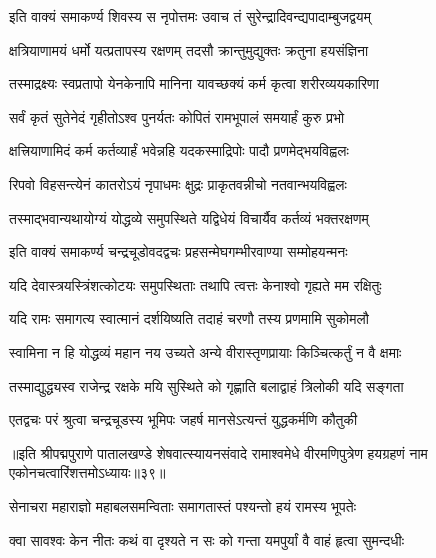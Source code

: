 \twolineshloka
{इति वाक्यं समाकर्ण्य शिवस्य स नृपोत्तमः}
{उवाच तं सुरेन्द्रादिवन्द्यपादाम्बुजद्वयम्}%


\twolineshloka
{क्षत्रियाणामयं धर्मो यत्प्रतापस्य रक्षणम्}
{तदसौ क्रान्तुमुद्युक्तः क्रतुना हयसंज्ञिना}%

\twolineshloka
{तस्माद्रक्ष्यः स्वप्रतापो येनकेनापि मानिना}
{यावच्छक्यं कर्म कृत्वा शरीरव्ययकारिणा}%

\twolineshloka
{सर्वं कृतं सुतेनेदं गृहीतोऽश्व पुनर्यतः}
{कोपितं रामभूपालं समयार्हं कुरु प्रभो}%

\twolineshloka
{क्षत्त्रियाणामिदं कर्म कर्तव्यार्हं भवेन्नहि}
{यदकस्माद्रिपोः पादौ प्रणमेद्भयविह्वलः}%

\twolineshloka
{रिपवो विहसन्त्येनं कातरोऽयं नृपाधमः}
{क्षुद्रः प्राकृतवन्नीचो नतवान्भयविह्वलः}%

\twolineshloka
{तस्माद्भवान्यथायोग्यं योद्धव्ये समुपस्थिते}
{यद्विधेयं विचार्यैव कर्तव्यं भक्तरक्षणम्}%


\twolineshloka
{इति वाक्यं समाकर्ण्य चन्द्रचूडोवदद्वचः}
{प्रहसन्मेघगम्भीरवाण्या सम्मोहयन्मनः}%

\twolineshloka
{यदि देवास्त्रयस्त्रिंशत्कोटयः समुपस्थिताः}
{तथापि त्वत्तः केनाश्वो गृह्यते मम रक्षितुः}%

\twolineshloka
{यदि रामः समागत्य स्वात्मानं दर्शयिष्यति}
{तदाहं चरणौ तस्य प्रणमामि सुकोमलौ}%

\twolineshloka
{स्वामिना न हि योद्धव्यं महान नय उच्यते}
{अन्ये वीरास्तृणप्रायाः किञ्चित्कर्तुं न वै क्षमाः}%

\twolineshloka
{तस्माद्युद्ध्यस्व राजेन्द्र रक्षके मयि सुस्थिते}
{को गृह्णाति बलाद्वाहं त्रिलोकी यदि सङ्गता}%


\twolineshloka
{एतद्वचः परं श्रुत्वा चन्द्रचूडस्य भूमिपः}
{जहर्ष मानसेऽत्यन्तं युद्धकर्मणि कौतुकी}%

॥इति श्रीपद्मपुराणे पातालखण्डे शेषवात्स्यायनसंवादे रामाश्वमेधे वीरमणिपुत्रेण हयग्रहणं नाम एकोनचत्वारिंशत्तमोऽध्यायः॥३९॥



\twolineshloka
{सेनाचरा महाराज्ञो महाबलसमन्विताः}
{समागतास्तं पश्यन्तो हयं रामस्य भूपतेः}%

\twolineshloka
{क्वा सावश्वः केन नीतः कथं वा दृश्यते न सः}
{को गन्ता यमपुर्यां वै वाहं हृत्वा सुमन्दधीः}%

